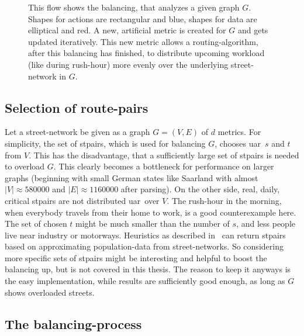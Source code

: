     \begin{figure}
        \centering
        
        \caption[Overview of balancing a graph]{%
            This flow shows the \gls{balancing}, that analyzes a given graph $G$.
            Shapes for actions are rectangular and blue, shapes for data are elliptical and red.
            A new, artificial \gls{metric} is created for $G$ and gets updated iteratively.
            This new \gls{metric} allows a routing-algorithm, after this \gls{balancing} has finished, to distribute upcoming workload (like during rush-hour) more evenly over the underlying street-network in $G$.
            \label{fig:balancing}
        }
    \end{figure}

    \subsection{Selection of route-pairs}

        Let a street-network be given as a graph $G = (V, E)$ of $d$ \glspl{metric}.
        For simplicity, the set of \glspl{stpair}, which is used for balancing $G$, chooses \gls{uar}\ $s$ and $t$ from $V$.
        This has the disadvantage, that a sufficiently large set of \glspl{stpair} is needed to overload $G$.
        This clearly becomes a bottleneck for performance on larger graphs (beginning with small German states like Saarland with almost $|V| \approx \num{580000}$ and $|E| \approx \num{1160000}$ after parsing).
        On the other side, real, daily, critical \glspl{stpair} are not distributed \gls{uar}\ over $V$.
        The rush-hour in the morning, when everybody travels from their home to work, is a good counterexample here.
        The set of chosen $t$ might be much smaller than the number of $s$, and less people live near industry or motorways.
        Heuristics as described in~\cite{bakillah:population_from_osm} can return \glspl{stpair} based on approximating population-data from street-networks.
        So considering more specific sets of \glspl{stpair} might be interesting and helpful to boost the \gls{balancing} up, but is not covered in this thesis.
        The reason to keep it anyways is the easy implementation, while results are sufficiently good enough, as long as $G$ shows overloaded streets.

    \subsection{The balancing-process}

